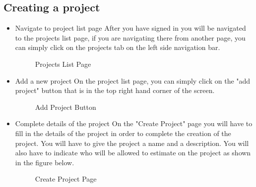 \subsection{Creating a project}
\begin{itemize}
	\item{Navigate to project list page}
	\newline
	After you have signed in you will be navigated to the projects list page, if you are navigating there from another page, you can simply click on the projects tab on the left side navigation bar.
	\begin{figure}[H]
	    	\centering
	    	\caption{Projects List Page}
	    	\label{fig:Learning rate 0.1}
   	\end{figure}
	\item{Add a new project}
	\newline
	On the project list page, you can simply click on the "add project" button that is in the top right hand corner of the screen.
	\begin{figure}[H]
	    	\centering
	    	\caption{Add Project Button}
	    	\label{fig:Learning rate 0.1}
   	\end{figure}
	\item{Complete details of the project}
	\newline
	On the "Create Project" page you will have to fill in the details of the project in order to complete the creation of the project. You will have to give the project a name and a description. You will also have to indicate who will be allowed to estimate on the project as shown in the figure below.
	\begin{figure}[H]
	    	\centering
	    	\caption{Create Project Page}
	    	\label{fig:Learning rate 0.1}
   	\end{figure}
\end{itemize}
